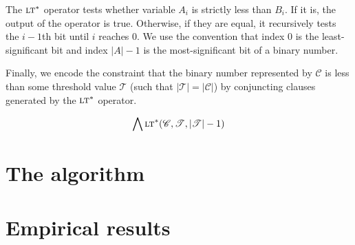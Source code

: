 \documentclass{article}
\begin{document}
\noindent The $\textsc{lt}^*$ operator tests whether variable $A_i$ is strictly
less than $B_i$. If it is, the output of the operator is true. Otherwise, if
they are equal, it recursively tests the $i - 1$th bit until $i$ reaches $0$. We
use the convention that index $0$ is the least-significant bit and index $\vert
A \vert - 1$ is the most-significant bit of a binary number.

Finally, we encode the constraint that the binary number represented by
$\mathscr{C}$ is less than some threshold value $\mathscr{T}$ (such that  $\vert
\mathscr{T} \vert = \vert \mathscr{C} \vert$) by conjuncting clauses generated
by the $\textsc{lt}^*$ operator.

\begin{equation}
  \bigwedge \textsc{lt}^*(\mathscr{C}, \mathscr{T}, \vert \mathscr{T} \vert - 1)
\end{equation}

\break

\section{The algorithm}

\section{Empirical results}

\end{document}
